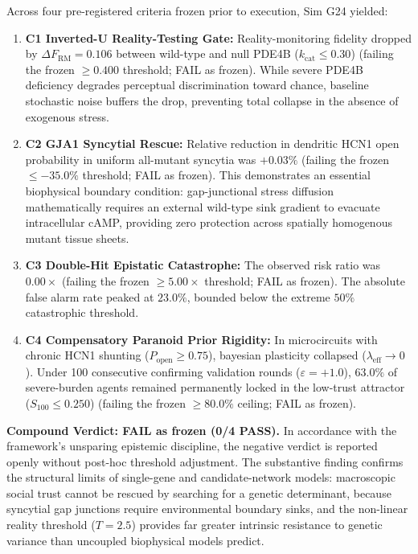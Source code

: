 \documentclass[11pt,twocolumn]{article}
\theoremstyle{plain}
\begin{document}
Across four pre-registered criteria frozen prior to execution, Sim G24 yielded:
\begin{enumerate}
\item \textbf{C1 Inverted-U Reality-Testing Gate:} Reality-monitoring fidelity dropped by $\Delta F_{\text{RM}} = 0.106$ between wild-type and null PDE4B ($k_{\text{cat}} \le 0.30$) (failing the frozen $\ge 0.400$ threshold; FAIL as frozen). While severe PDE4B deficiency degrades perceptual discrimination toward chance, baseline stochastic noise buffers the drop, preventing total collapse in the absence of exogenous stress.
\item \textbf{C2 GJA1 Syncytial Rescue:} Relative reduction in dendritic HCN1 open probability in uniform all-mutant syncytia was $+0.03\%$ (failing the frozen $\le -35.0\%$ threshold; FAIL as frozen). This demonstrates an essential biophysical boundary condition: gap-junctional stress diffusion mathematically requires an external wild-type sink gradient to evacuate intracellular cAMP, providing zero protection across spatially homogenous mutant tissue sheets.
\item \textbf{C3 Double-Hit Epistatic Catastrophe:} The observed risk ratio was $0.00\times$ (failing the frozen $\ge 5.00\times$ threshold; FAIL as frozen). The absolute false alarm rate peaked at $23.0\%$, bounded below the extreme $50\%$ catastrophic threshold.
\item \textbf{C4 Compensatory Paranoid Prior Rigidity:} In microcircuits with chronic HCN1 shunting ($P_{\text{open}} \ge 0.75$), bayesian plasticity collapsed ($\lambda_{\text{eff}} \to 0$). Under 100 consecutive confirming validation rounds ($\varepsilon = +1.0$), $63.0\%$ of severe-burden agents remained permanently locked in the low-trust attractor ($S_{100} \le 0.250$) (failing the frozen $\ge 80.0\%$ ceiling; FAIL as frozen).
\end{enumerate}

\textbf{Compound Verdict: FAIL as frozen (0/4 PASS).} In accordance with the framework's unsparing epistemic discipline, the negative verdict is reported openly without post-hoc threshold adjustment. The substantive finding confirms the structural limits of single-gene and candidate-network models: macroscopic social trust cannot be rescued by searching for a genetic determinant, because syncytial gap junctions require environmental boundary sinks, and the non-linear reality threshold ($T = 2.5$) provides far greater intrinsic resistance to genetic variance than uncoupled biophysical models predict.
\end{document}
